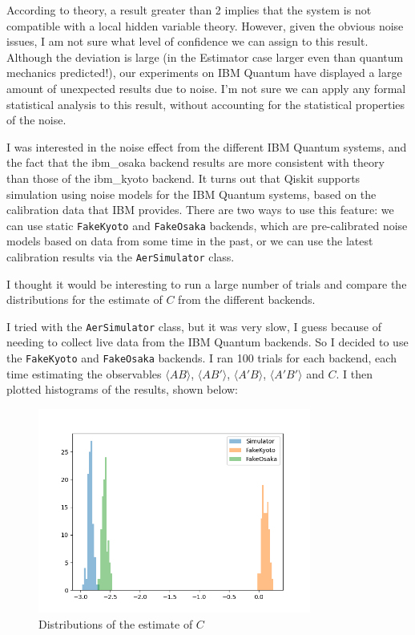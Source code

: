 \documentclass[12pt]{extarticle}
\begin{document}
\begin{enumerate}[(a)]
According to theory, a result greater than 2 implies that the system is not compatible with a local hidden variable theory.
However, given the obvious noise issues, I am not sure what level of confidence we can assign to this result.
Although the deviation is large (in the Estimator case larger even than quantum mechanics predicted!), our experiments on IBM Quantum
have displayed a large amount of unexpected results due to noise.
I'm not sure we can apply any formal statistical analysis to this result, without accounting for the statistical properties of the noise.

\end{enumerate}

I was interested in the noise effect from the different IBM Quantum systems, and the fact that the ibm\_osaka backend results are more consistent with theory than those of the ibm\_kyoto backend.
It turns out that Qiskit supports simulation using noise models for the IBM Quantum systems, based on the calibration data that IBM provides.
There are two ways to use this feature: we can use static \texttt{FakeKyoto} and \texttt{FakeOsaka} backends, which are pre-calibrated noise models
based on data from some time in the past, or we can use the latest calibration results via the \texttt{AerSimulator} class.

I thought it would be interesting to run a large number of trials and compare the distributions for the estimate of $C$ from the different backends.

I tried with the \texttt{AerSimulator} class, but it was very slow, I guess because of needing to collect live data from the IBM Quantum backends.
So I decided to use the \texttt{FakeKyoto} and \texttt{FakeOsaka} backends.
I ran 100 trials for each backend, each time estimating the observables $\langle AB\rangle$, $\langle AB'\rangle$, $\langle A'B\rangle$, $\langle A'B'\rangle$ and $C$.
I then plotted histograms of the results, shown below:
\begin{figure}[H]
\centering
\includegraphics[width=0.80\textwidth]{images/chsh_fakenoise_distributions.png}
\caption{Distributions of the estimate of $C$}
\end{figure}
\end{document}
